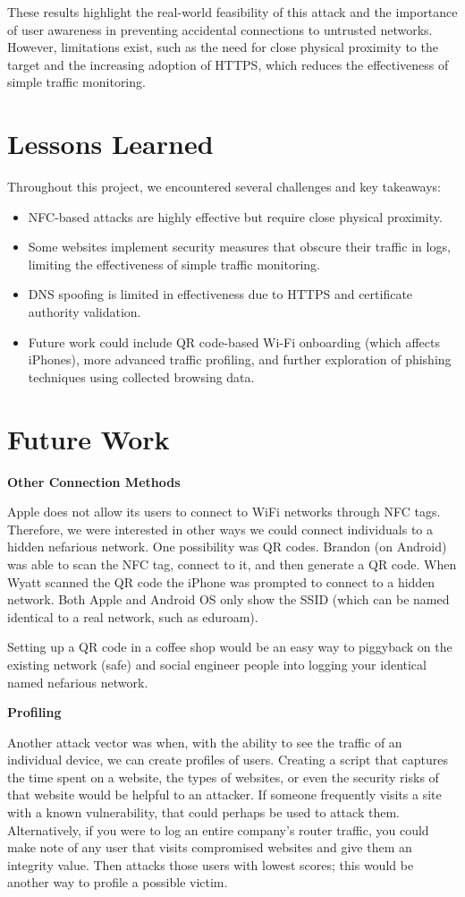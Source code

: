 \documentclass[sigconf]{acmart}
\begin{document}
These results highlight the real-world feasibility of this attack and the importance of user awareness in preventing accidental connections to untrusted networks. However, limitations exist, such as the need for close physical proximity to the target and the increasing adoption of HTTPS, which reduces the effectiveness of simple traffic monitoring.

\section{Lessons Learned}
Throughout this project, we encountered several challenges and key takeaways:
\begin{itemize}
    \item NFC-based attacks are highly effective but require close physical proximity.
    \item Some websites implement security measures that obscure their traffic in logs, limiting the effectiveness of simple traffic monitoring.
    \item DNS spoofing is limited in effectiveness due to HTTPS and certificate authority validation.
    \item Future work could include QR code-based Wi-Fi onboarding (which affects iPhones), more advanced traffic profiling, and further exploration of phishing techniques using collected browsing data.
\end{itemize}

\section{Future Work}
\textbf{Other Connection Methods}

Apple does not allow its users to connect to WiFi networks through NFC tags. Therefore, we were interested in other ways we could connect individuals to a hidden nefarious network. One possibility was QR codes. Brandon (on Android) was able to scan the NFC tag, connect to it, and then generate a QR code. When Wyatt scanned the QR code the iPhone was prompted to connect to a hidden network. Both Apple and Android OS only show the SSID (which can be named identical to a real network, such as eduroam).

Setting up a QR code in a coffee shop would be an easy way to piggyback on the existing network (safe) and social engineer people into logging your identical named nefarious network. 

\textbf{Profiling}

Another attack vector was when, with the ability to see the traffic of an individual device, we can create profiles of users. Creating a script that captures the time spent on a website, the types of websites, or even the security risks of that website would be helpful to an attacker. If someone frequently visits a site with a known vulnerability, that could perhaps be used to attack them. Alternatively, if you were to log an entire company's router traffic, you could make note of any user that visits compromised websites and give them an integrity value. Then attacks those users with lowest scores; this would be another way to profile a possible victim. 
\end{document}
